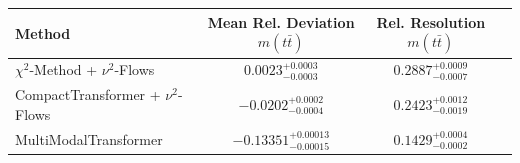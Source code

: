     \begin{tabular}{lccc}
        \toprule
        Method & Mean Rel. Deviation $m(t\bar{t})$ & Rel. Resolution $m(t\bar{t})$ \\
        \midrule
        $\chi^2$-Method + $\nu^2$-Flows & $0.0023^{+0.0003}_{-0.0003}$ & $0.2887^{+0.0009}_{-0.0007}$ \\
        CompactTransformer + $\nu^2$-Flows & $-0.0202^{+0.0002}_{-0.0004}$ & $0.2423^{+0.0012}_{-0.0019}$ \\
        MultiModalTransformer & $-0.13351^{+0.00013}_{-0.00015}$ & $0.1429^{+0.0004}_{-0.0002}$ \\
        \bottomrule
    \end{tabular}